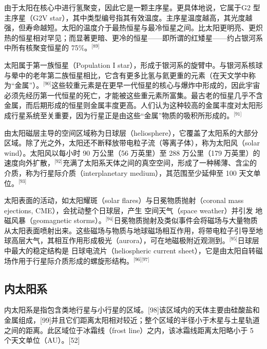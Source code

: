 由于太阳在核心中进行氢聚变，因此它是一颗主序星。更具体地说，它属于G2 型主序星（G2V star），其中类型编号指其有效温度。主序星温度越高，其光度越强，但寿命越短。太阳的温度介于最热恒星与最冷恒星之间。比太阳更明亮、更炽热的恒星相对罕见；而显著更暗、更冷的恒星——即所谓的红矮星——约占银河系中所有核聚变恒星的 75\%。\(^\text{[89]}\)

太阳属于第一族恒星（Population I star），形成于银河系的旋臂中。与银河系核球与晕中的老年第二族恒星相比，它含有更多比氢与氦更重的元素（在天文学中称为“金属”）。\(^\text{[90]}\)这些较重元素是在更早一代恒星的核心与爆炸中形成的，因此宇宙必须先经历第一代恒星的死亡，才能被这些重元素所富集。最古老的恒星几乎不含金属，而后期形成的恒星则金属丰度更高。人们认为这种较高的金属丰度对太阳形成行星系统至关重要，因为行星正是由这些“金属”物质的吸积所形成的。\(^\text{[91]}\)

由太阳磁层主导的空间区域称为日球层（heliosphere），它覆盖了太阳系的大部分区域。除了光之外，太阳还不断释放带电粒子流（等离子体），称为太阳风（solar wind）。太阳风以每小时 90 万公里（56 万英里）至 288 万公里（179 万英里）的速度向外扩散，\(^\text{[92]}\)充满了太阳系天体之间的真空空间，形成了一种稀薄、含尘的介质，称为行星际介质（interplanetary medium），其范围至少延伸至 100 天文单位。\(^\text{[93]}\)

太阳表面的活动，如太阳耀斑（solar flares）与日冕物质抛射（coronal mass ejections, CME），会扰动整个日球层，产生 空间天气（space weather）并引发 地磁风暴（geomagnetic storms）。\(^\text{[94]}\)日冕物质抛射及类似事件会将磁场与大量物质从太阳表面喷射出来。这些磁场与物质与地球磁场相互作用，将带电粒子引导至地球高层大气，其相互作用形成极光（aurora），可在地磁极附近观测到。\(^\text{[95]}\)日球层中最大的稳定结构是 日球电流片（heliospheric current sheet），它是由太阳自转磁场作用于行星际介质形成的螺旋形结构。\(^\text{[96][97]}\)
\subsection{内太阳系}
内太阳系是指包含类地行星与小行星的区域。[98]该区域内的天体主要由硅酸盐和金属组成，[99]并且它们距离太阳相对较近；整个区域的半径小于木星与土星轨道之间的距离。此区域位于冰霜线（frost line）之内，该冰霜线距离太阳略小于 5 个天文单位（AU）。[52]
